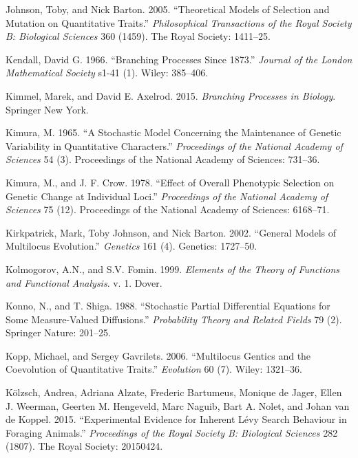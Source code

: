 \documentclass[]{article}
\begin{document}
\leavevmode\hypertarget{ref-Johnson2005}{}%
Johnson, Toby, and Nick Barton. 2005. ``Theoretical Models of Selection
and Mutation on Quantitative Traits.'' \emph{Philosophical Transactions
of the Royal Society B: Biological Sciences} 360 (1459). The Royal
Society: 1411--25.

\leavevmode\hypertarget{ref-Kendall1966}{}%
Kendall, David G. 1966. ``Branching Processes Since 1873.''
\emph{Journal of the London Mathematical Society} s1-41 (1). Wiley:
385--406.

\leavevmode\hypertarget{ref-Kimmel2015}{}%
Kimmel, Marek, and David E. Axelrod. 2015. \emph{Branching Processes in
Biology}. Springer New York.

\leavevmode\hypertarget{ref-Kimura1965}{}%
Kimura, M. 1965. ``A Stochastic Model Concerning the Maintenance of
Genetic Variability in Quantitative Characters.'' \emph{Proceedings of
the National Academy of Sciences} 54 (3). Proceedings of the National
Academy of Sciences: 731--36.

\leavevmode\hypertarget{ref-Kimura1978}{}%
Kimura, M., and J. F. Crow. 1978. ``Effect of Overall Phenotypic
Selection on Genetic Change at Individual Loci.'' \emph{Proceedings of
the National Academy of Sciences} 75 (12). Proceedings of the National
Academy of Sciences: 6168--71.

\leavevmode\hypertarget{ref-Kirkpatrick1727}{}%
Kirkpatrick, Mark, Toby Johnson, and Nick Barton. 2002. ``General Models
of Multilocus Evolution.'' \emph{Genetics} 161 (4). Genetics: 1727--50.

\leavevmode\hypertarget{ref-kolmogorov1999elements}{}%
Kolmogorov, A.N., and S.V. Fomin. 1999. \emph{Elements of the Theory of
Functions and Functional Analysis}. v. 1. Dover.

\leavevmode\hypertarget{ref-Konno1988}{}%
Konno, N., and T. Shiga. 1988. ``Stochastic Partial Differential
Equations for Some Measure-Valued Diffusions.'' \emph{Probability Theory
and Related Fields} 79 (2). Springer Nature: 201--25.

\leavevmode\hypertarget{ref-Kopp2006}{}%
Kopp, Michael, and Sergey Gavrilets. 2006. ``Multilocus Gentics and the
Coevolution of Quantitative Traits.'' \emph{Evolution} 60 (7). Wiley:
1321--36.

\leavevmode\hypertarget{ref-Klzsch2015}{}%
Kölzsch, Andrea, Adriana Alzate, Frederic Bartumeus, Monique de Jager,
Ellen J. Weerman, Geerten M. Hengeveld, Marc Naguib, Bart A. Nolet, and
Johan van de Koppel. 2015. ``Experimental Evidence for Inherent Lévy
Search Behaviour in Foraging Animals.'' \emph{Proceedings of the Royal
Society B: Biological Sciences} 282 (1807). The Royal Society: 20150424.
\end{document}
